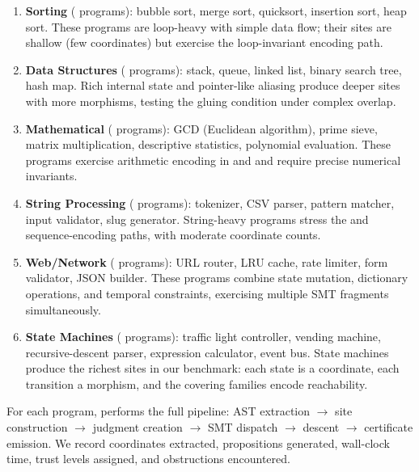 \begin{enumerate}[leftmargin=1.5em]
  \item \textbf{Sorting} (\expDomainSortCount{} programs):
    bubble sort, merge sort, quicksort, insertion sort, heap sort.
    These programs are loop-heavy with simple data flow; their sites
    are shallow (few coordinates) but exercise the loop-invariant
    encoding path.

  \item \textbf{Data Structures} (\expDomainDsCount{} programs):
    stack, queue, linked list, binary search tree, hash map.
    Rich internal state and pointer-like aliasing produce deeper sites
    with more morphisms, testing the gluing condition under complex
    overlap.

  \item \textbf{Mathematical} (\expDomainMathCount{} programs):
    GCD (Euclidean algorithm), prime sieve, matrix multiplication,
    descriptive statistics, polynomial evaluation.
    These programs exercise arithmetic encoding in \QFLIA{} and \QFLRA{}
    and require precise numerical invariants.

  \item \textbf{String Processing} (\expDomainStrCount{} programs):
    tokenizer, CSV parser, pattern matcher, input validator, slug
    generator.
    String-heavy programs stress the \QFUF{} and sequence-encoding
    paths, with moderate coordinate counts.

  \item \textbf{Web/Network} (\expDomainWebCount{} programs):
    URL router, LRU cache, rate limiter, form validator, JSON builder.
    These programs combine state mutation, dictionary operations, and
    temporal constraints, exercising multiple SMT fragments
    simultaneously.

  \item \textbf{State Machines} (\expDomainSmCount{} programs):
    traffic light controller, vending machine, recursive-descent parser,
    expression calculator, event bus.
    State machines produce the richest sites in our benchmark: each
    state is a coordinate, each transition a morphism, and the
    covering families encode reachability.
\end{enumerate}

\noindent
For each program, \JuGeo{} performs the full pipeline:
AST extraction $\to$ site construction $\to$ judgment creation $\to$
SMT dispatch $\to$ descent $\to$ certificate emission.
We record coordinates extracted, propositions generated, wall-clock
time, trust levels assigned, and obstructions encountered.

